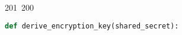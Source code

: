 201~200~\documentclass{article}
\begin{document}
\begin{lstlisting}[language=Python, caption=Shared Secret Computation and Encryption Key Derivation]
	                                                                                                                                                                                                                                                                                                	                                                                                                                                        	    	                                                                                                	                                                                                                                                                                                                                                                                                                                                	                                                                        	                                                                        	                                                                                                                                        	                                                                                                                                                                                                                    def derive_encryption_key(shared_secret):
	                                                                                                                                                                                                                                                                                                	                                                                                                                                        	    	                                                                                                	                                                                                                                                                                                                                                                                                                                                	                                                                        	                                                                        	                                                                                                                                        	                                                                                                                                                                                                                        hkdf = HKDF(

\end{lstlisting}
\end{document}
